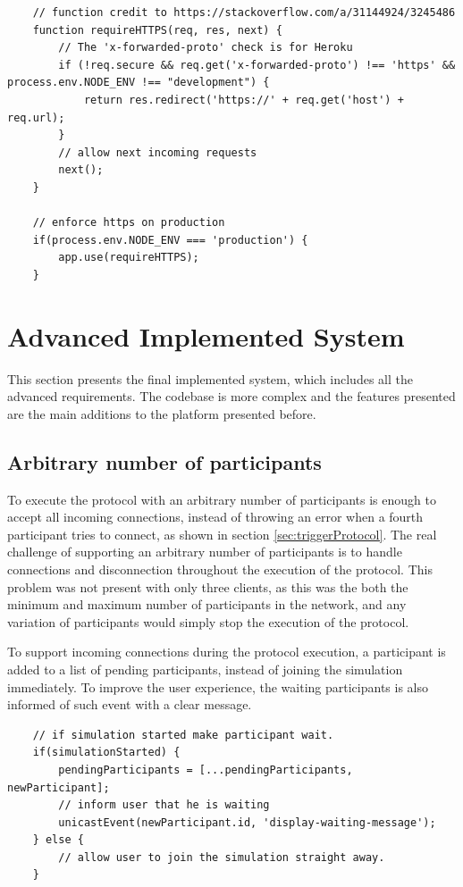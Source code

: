 \begin{lstlisting}
    // function credit to https://stackoverflow.com/a/31144924/3245486
    function requireHTTPS(req, res, next) {
        // The 'x-forwarded-proto' check is for Heroku
        if (!req.secure && req.get('x-forwarded-proto') !== 'https' && process.env.NODE_ENV !== "development") {
            return res.redirect('https://' + req.get('host') + req.url);
        }
        // allow next incoming requests
        next();
    }
    
    // enforce https on production
    if(process.env.NODE_ENV === 'production') {
        app.use(requireHTTPS);
    }
\end{lstlisting}


\section{Advanced Implemented System}
This section presents the final implemented system, which includes all the advanced requirements. The codebase is more complex and the features presented are the main additions to the platform presented before.


\subsection{Arbitrary number of participants} \label{sec:arbitraryPartipantN}
To execute the protocol with an arbitrary number of participants is enough to accept all incoming connections, instead of throwing an error when a fourth participant tries to connect, as shown in section \ref{sec:triggerProtocol}. The real challenge of supporting an arbitrary number of participants is to handle connections and disconnection throughout the execution of the protocol. This problem was not present with only three clients, as this was the both the minimum and maximum number of participants in the network, and any variation of participants would simply stop the execution of the protocol. \newline

To support incoming connections during the protocol execution, a participant is added to a list of pending participants, instead of joining the simulation immediately. To improve the user experience, the waiting participants is also informed of such event with a clear message.

\begin{lstlisting}
    // if simulation started make participant wait.
    if(simulationStarted) {
        pendingParticipants = [...pendingParticipants, newParticipant];
        // inform user that he is waiting 
        unicastEvent(newParticipant.id, 'display-waiting-message');
    } else {
        // allow user to join the simulation straight away.
    }
\end{lstlisting}

